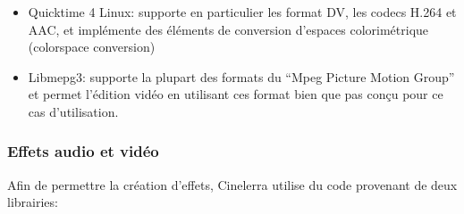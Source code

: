 \begin{itemize}





  \item {Quicktime 4 Linux: supporte en particulier les format DV,
    les codecs H.264 et AAC, et implémente des éléments de conversion
    d'espaces colorimétrique (colorspace conversion)}





  \item {Libmepg3: supporte la plupart des formats du ``Mpeg Picture
    Motion Group''  et permet l'édition vidéo en
    utilisant ces format bien que pas conçu pour ce cas d'utilisation.}

\end{itemize}

\subsubsection {Effets audio et vidéo}

Afin de permettre la création d'effets, Cinelerra utilise du  code
provenant de deux librairies:


